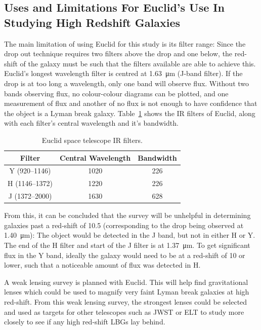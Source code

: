 	\subsection{Uses and Limitations For Euclid’s Use In Studying High Redshift Galaxies} %
	\label{sub:uses_and_limitations_for_euclid_s_use_in_studying_high_redshift_galaxies}
		The main limitation of using Euclid for this study is its filter range: Since the drop out technique requires two filters above the drop and one below, the red-shift of the galaxy must be such that the filters available are able to achieve this. Euclid’s longest wavelength filter is centred at \SI{1.63}{\micro\metre} (J-band filter). If the drop is at too long a wavelength, only one band will observe flux. Without two bands observing flux, no colour-colour diagrams can be plotted, and one measurement of flux and another of no flux is not enough to have confidence that the object is a Lyman break galaxy. Table~\ref{fig:euclid_ir_filters} shows the IR filters of Euclid, along with each filter's central wavelength and it’s bandwidth.
		\begin{table}[ht]
			\centering
				\begin{tabular}{c|c|c}
					Filter & Central Wavelength & Bandwidth \\
					\hline\hline
					Y (920--1146) & 1020 & 226 \\
					H (1146--1372) & 1220 & 226 \\
					J (1372--2000) & 1630 & 628 \\
				\end{tabular}
				\caption{Euclid space telescope IR filters.\label{fig:euclid_ir_filters}}
		\end{table}

		From this, it can be concluded that the survey will be unhelpful in determining galaxies past a red-shift of 10.5 (corresponding to the drop being observed at \SI{1.40}{\micro\metre}): The object would be detected in the J band, but not in either H or Y. The end of the H filter and start of the J filter is at \SI{1.37}{\micro\metre}. To get significant flux in the Y band, ideally the galaxy would need to be at a red-shift of 10 or lower, such that a noticeable amount of flux was detected in H.

		A weak lensing survey is planned with Euclid. This will help find gravitational lenses which could be used to magnify very faint Lyman break galaxies at high red-shift. From this weak lensing survey, the strongest lenses could be selected and used as targets for other telescopes such as JWST or ELT to study more closely to see if any high red-shift LBGs lay behind.

